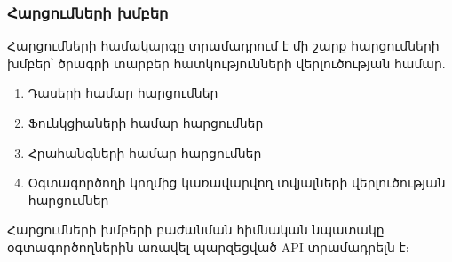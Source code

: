 {
    \subsubsection{Հարցումների խմբեր}\label{subsubsec:queryGroups}
    Հարցումների համակարգը տրամադրում է մի շարք հարցումների խմբեր՝ ծրագրի տարբեր հատկությունների վերլուծության համար.
    \begin{enumerate}
        \item Դասերի համար հարցումներ
        \item Ֆունկցիաների համար հարցումներ
        \item Հրահանգների համար հարցումներ
        \item Օգտագործողի կողմից կառավարվող տվյալների վերլուծության հարցումներ
    \end{enumerate}

    Հարցումների խմբերի բաժանման հիմնական նպատակը օգտագործողներին առավել պարզեցված API տրամադրելն է։

    

    

    

    
}